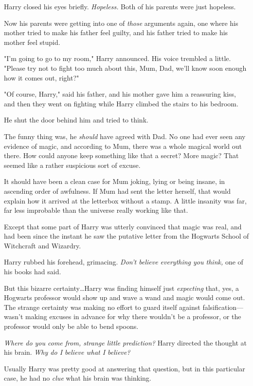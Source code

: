 Harry closed his eyes briefly. \emph{Hopeless.} Both of his parents were just
hopeless.

Now his parents were getting into one of \emph{those} arguments again, one
where his mother tried to make his father feel guilty, and his father tried to
make his mother feel stupid.

"I'm going to go to my room," Harry announced. His voice trembled a little.
"Please try not to fight too much about this, Mum, Dad, we'll know soon enough
how it comes out, right?"

"Of course, Harry," said his father, and his mother gave him a reassuring kiss,
and then they went on fighting while Harry climbed the stairs to his bedroom.

He shut the door behind him and tried to think.

The funny thing was, he \emph{should} have agreed with Dad. No one had ever
seen any evidence of magic, and according to Mum, there was a whole magical
world out there. How could anyone keep something like that a secret? More
magic? That seemed like a rather suspicious sort of excuse.

It should have been a clean case for Mum joking, lying or being insane, in
ascending order of awfulness. If Mum had sent the letter herself, that would
explain how it arrived at the letterbox without a stamp. A little insanity was
far, far less improbable than the universe really working like that.

Except that some part of Harry was utterly convinced that magic was real, and
had been since the instant he saw the putative letter from the Hogwarts School
of Witchcraft and Wizardry.

Harry rubbed his forehead, grimacing. \emph{Don't believe everything you
think,} one of his books had said.

But this bizarre certainty…Harry was finding himself just
\emph{expecting} that, yes, a Hogwarts professor would show up and wave a wand
and magic would come out. The strange certainty was making no effort to guard
itself against falsification—wasn't making excuses in advance for why there
wouldn't be a professor, or the professor would only be able to bend spoons.

\emph{Where do you come from, strange little prediction?} Harry directed the
thought at his brain. \emph{Why do I believe what I believe?}

Usually Harry was pretty good at answering that question, but in this
particular case, he had no \emph{clue} what his brain was thinking.


